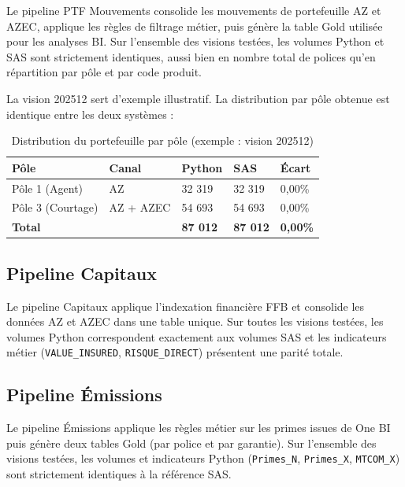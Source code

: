 Le pipeline PTF Mouvements consolide les mouvements de portefeuille AZ et AZEC,
applique les règles de filtrage métier, puis génère la table Gold utilisée pour les
analyses BI. Sur l’ensemble des visions testées, les volumes Python et SAS sont
strictement identiques, aussi bien en nombre total de polices qu’en répartition
par pôle et par code produit.

La vision 202512 sert d'exemple illustratif. La distribution par pôle obtenue
est identique entre les deux systèmes :

\begin{table}[H]
    \centering
    \caption{Distribution du portefeuille par pôle (exemple : vision 202512)}
    \label{tab:distrib_ptf}
    \begin{tabularx}{\textwidth}{@{}l l X X X@{}}
        \toprule
        \textbf{Pôle} & \textbf{Canal} & \textbf{Python} & \textbf{SAS} & \textbf{Écart} \\
        \midrule
        Pôle 1 (Agent)      & AZ          & 32 319 & 32 319 & 0,00\% \\
        Pôle 3 (Courtage)   & AZ + AZEC   & 54 693 & 54 693 & 0,00\% \\
        \midrule
        \textbf{Total}       &             & \textbf{87 012} & \textbf{87 012} & \textbf{0,00\%} \\
        \bottomrule
    \end{tabularx}
\end{table}

\subsection{Pipeline Capitaux}

Le pipeline Capitaux applique l’indexation financière FFB et consolide les données
AZ et AZEC dans une table unique. Sur toutes les visions testées, les volumes Python
correspondent exactement aux volumes SAS et les indicateurs métier
(\texttt{VALUE\_INSURED}, \texttt{RISQUE\_DIRECT}) présentent une parité totale.

\subsection{Pipeline Émissions}

Le pipeline Émissions applique les règles métier sur les primes issues de One BI
puis génère deux tables Gold (par police et par garantie). Sur l'ensemble des
visions testées, les volumes et indicateurs Python (\texttt{Primes\_N},
\texttt{Primes\_X}, \texttt{MTCOM\_X}) sont strictement identiques à la
référence SAS.

